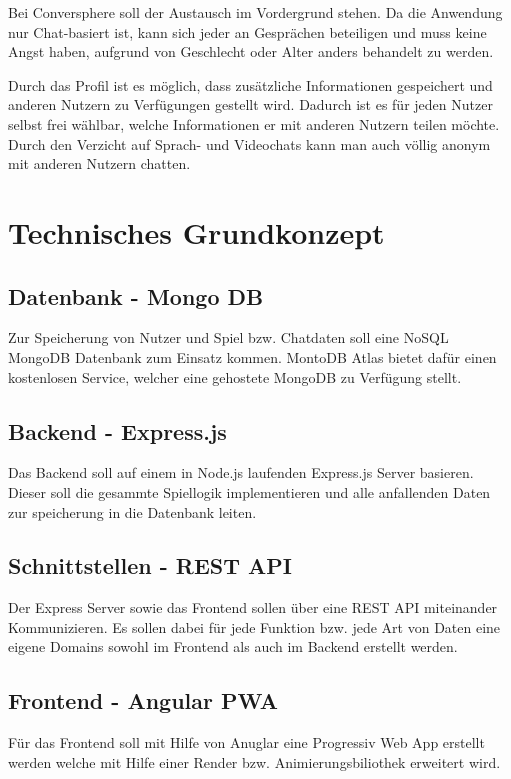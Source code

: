 \documentclass[conference]{IEEEtran}
\begin{document}
	Bei Conversphere soll der Austausch im Vordergrund stehen. Da die Anwendung nur Chat-basiert ist, kann sich jeder an Gesprächen beteiligen und muss keine Angst haben, aufgrund von Geschlecht oder Alter anders behandelt zu werden.
	
	Durch das Profil ist es möglich, dass zusätzliche Informationen gespeichert und anderen Nutzern zu Verfügungen gestellt wird. Dadurch ist es für jeden Nutzer selbst frei wählbar, welche Informationen er mit anderen Nutzern teilen möchte. Durch den Verzicht auf Sprach- und Videochats kann man auch völlig anonym mit anderen Nutzern chatten.
	\ \\

	\section{Technisches Grundkonzept}
	\subsection{Datenbank - Mongo DB}
	Zur Speicherung von Nutzer und Spiel bzw. Chatdaten soll eine NoSQL MongoDB Datenbank zum Einsatz kommen. MontoDB Atlas bietet dafür einen kostenlosen Service, welcher eine gehostete MongoDB zu Verfügung stellt.

	\subsection{Backend - Express.js}
	Das Backend soll auf einem in Node.js laufenden Express.js Server basieren. Dieser soll die gesammte Spiellogik implementieren und alle anfallenden Daten zur speicherung in die Datenbank leiten.

	\subsection{Schnittstellen - REST API}
	Der Express Server sowie das Frontend sollen über eine REST API miteinander Kommunizieren. Es sollen dabei für jede Funktion bzw. jede Art von Daten eine eigene Domains sowohl im Frontend als auch im Backend erstellt werden.
	
	\subsection{Frontend - Angular PWA}
	Für das Frontend soll mit Hilfe von Anuglar eine Progressiv Web App erstellt werden welche mit Hilfe einer Render bzw. Animierungsbiliothek erweitert wird.
\end{document}
